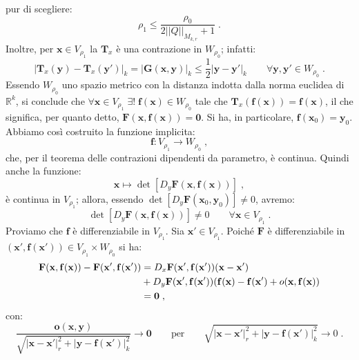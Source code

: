 \documentclass[a4paper,12pt]{report}
\theoremstyle{plain}
\theoremstyle{definition}
\theoremstyle{remark}
\numberwithin{equation}{section}
\begin{document}
pur di scegliere:
\begin{equation}
\rho_1 \le \frac{\rho_0}{2||Q||_{M_{k,r}}+1}\;.
\end{equation}
Inoltre, per $\mathbf{x} \in V_{\rho_1}$ la $\mathbf{T}_x$ è una contrazione in $W_{\rho_0}$; infatti:
\begin{equation}
|\mathbf{T}_x(\mathbf{y})-\mathbf{T}_x(\mathbf{y}')|_k = |\mathbf{G}(\mathbf{x},\mathbf{y})|_k \le \frac{1}{2}|\mathbf{y}-\mathbf{y}'|_k\qquad \forall \mathbf{y},\mathbf{y}' \in W_{\rho_0}\;.
\end{equation}
Essendo $W_{\rho_0}$ uno spazio metrico con la distanza indotta dalla norma euclidea di $\mathbb{R}^k$, si conclude che $\forall \mathbf{x} \in V_{\rho_1}\; \exists!\;\mathbf{f}(\mathbf{x}) \in W_{\rho_0}$ tale che $\mathbf{T}_x(\mathbf{f}(\mathbf{x}))=\mathbf{f}(\mathbf{x})$, il che significa, per quanto detto, $\mathbf{F}(\mathbf{x},\mathbf{f}(\mathbf{x}))=\mathbf{0}$. Si ha, in particolare, $\mathbf{f}(\mathbf{x}_0)=\mathbf{y}_0$. Abbiamo così costruito la funzione implicita:
\begin{equation}
\mathbf{f}:V_{\rho_1} \to W_{\rho_0}\;,
\end{equation}
che, per il teorema delle contrazioni dipendenti da parametro, è continua. Quindi anche la funzione:
\begin{equation}
\mathbf{x} \mapsto \det[D_y\mathbf{F}(\mathbf{x},\mathbf{f}(\mathbf{x}))]\;,
\end{equation}
è continua in $V_{\rho_1}$; allora, essendo $\det[D_y\mathbf{F}(\mathbf{x}_0,\mathbf{y}_0)]\ne 0$, avremo:
\begin{equation}
\det[D_y\mathbf{F}(\mathbf{x},\mathbf{f}(\mathbf{x}))] \ne 0 \qquad \forall \mathbf{x} \in V_{\rho_1}\;.
\end{equation}
Proviamo che $\mathbf{f}$ è differenziabile in $V_{\rho_1}$. Sia $\mathbf{x}' \in V_{\rho_1}$. Poiché $\mathbf{F}$ è differenziabile in 
$(\mathbf{x}',\mathbf{f}(\mathbf{x}')) \in V_{\rho_1} \times W_{\rho_0}$ si ha:
\begin{align}
\mathbf{F}(\mathbf{x},\mathbf{f}(\mathbf{x}))-\mathbf{F}(\mathbf{x}',\mathbf{f}(\mathbf{x}')) &= D_x\mathbf{F}(\mathbf{x}',\mathbf{f}(\mathbf{x}'))(\mathbf{x}-\mathbf{x}')\notag \\
&+D_y\mathbf{F}(\mathbf{x}',\mathbf{f}(\mathbf{x}'))(\mathbf{f}(\mathbf{x})-\mathbf{f}(\mathbf{x}')+o(\mathbf{x},\mathbf{f}(\mathbf{x})) \notag \\
&=\mathbf{0}\;,
\end{align}
con:
\begin{equation}
\frac{\mathbf{o}(\mathbf{x},\mathbf{y})}{\sqrt{|\mathbf{x}-\mathbf{x}'|_r^2+|\mathbf{y}-\mathbf{f}(\mathbf{x}')|_k^2}} \to \mathbf{0}
\qquad\mbox{per}\qquad \sqrt{|\mathbf{x}-\mathbf{x}'|_r^2+|\mathbf{y}-\mathbf{f}(\mathbf{x}')|_k^2} \to 0\;.
\end{equation}
\end{document}
